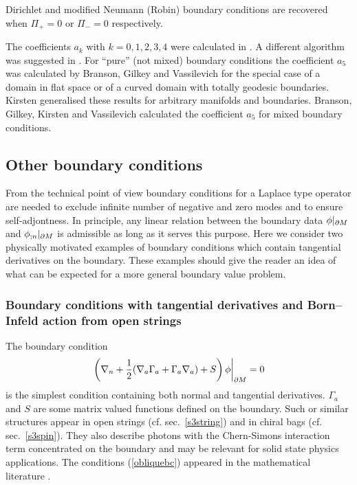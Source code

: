 Dirichlet and modified Neumann (Robin) boundary conditions 
are recovered when $\Pi_+=0$
or $\Pi_-=0$ respectively.

The coefficients $a_k$ with $k=0,1,2,3,4$ were calculated
in  \cite{McKean:1967,Kennedy:1980ar,Smith:1981,Melmed:1988hm,Moss:1989mz,
Branson:1990a,McAvity:1991we,McAvity:1992rf,Vassilevich:1995we}.
A different algorithm was suggested in \cite{Cognola:1990kq}.
For ``pure'' (not mixed) boundary conditions the 
coefficient $a_5$ was calculated
by Branson, Gilkey and Vassilevich \cite{Branson:1997cm} for the
special case of a domain in flat space or of a curved domain with
totally geodesic boundaries. Kirsten \cite{Kirsten:1997qd} generalised
these results for arbitrary manifolds and boundaries. Branson, Gilkey,
Kirsten and Vassilevich \cite{Branson:1999jz} calculated the coefficient
$a_5$ for mixed boundary conditions.
\subsection{Other boundary conditions}\label{s5other}
From the technical point of view boundary conditions for a Laplace
type operator are needed to exclude infinite number of negative and
zero modes and to ensure self-adjontness. In principle, any linear
relation between the boundary data $\phi\vert_{\partial M}$ and $\phi_{;n}\vert_{\partial M}$
is admissible as long as it serves this purpose. Here we consider
two physically motivated examples of boundary conditions which
contain tangential derivatives on the boundary. These examples should
give the reader an idea of what can be expected for a more general 
boundary value problem.
\subsubsection{Boundary conditions with tangential derivatives and
Born--Infeld action from open strings}\label{s5tang}
The boundary condition
\begin{equation}
\left. \left( \nabla_n +\frac 12 ( \nabla_a \Gamma_a + \Gamma_a \nabla_a )
+S \right) \phi\right\vert_{\partial M}=0 \label{obliquebc}
\end{equation}
is the simplest condition containing both normal and tangential
derivatives. $\Gamma_a$ and $S$ are some matrix valued functions
defined on the boundary. Such or similar structures appear in
open strings (cf. sec.\ \ref{s3string}) and in chiral bags
(cf. sec.\ \ref{s3spin}). They also describe photons with the
Chern-Simons interaction term concentrated on the boundary
\cite{Elizalde:1998ha,Bordag:1999ux}
and may be relevant for solid state physics applications.
The conditions (\ref{obliquebc}) appeared in the mathematical
literature \cite{Grubb:1974,Gilkey:1983}.

